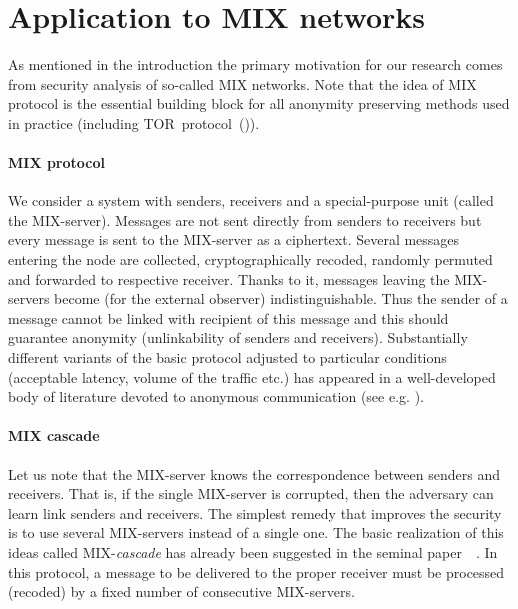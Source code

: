 \documentclass[submission]{dmtcs}
\begin{document}
\section{Application to MIX networks}
\label{MIX}

As mentioned in the introduction the primary motivation for our research comes from  security analysis of so-called MIX networks. 
Note that the idea of MIX protocol is the essential building block for all anonymity preserving methods used in practice (including TOR~protocol~(\cite{TOR04})). 


\paragraph{MIX protocol} We consider a system with senders, receivers and a special-purpose unit (called the MIX-server). Messages are not sent directly from senders to receivers but every message is sent to the MIX-server as a ciphertext. Several messages entering the node are collected,  cryptographically recoded, randomly permuted and forwarded to respective receiver. Thanks to it, messages leaving the MIX-servers become (for the external observer) indistinguishable. Thus the  sender of a message cannot be linked with recipient of this  message and this should guarantee anonymity (unlinkability of senders and receivers).  
Substantially different variants of the basic protocol adjusted to particular conditions (acceptable latency, volume of the traffic etc.)    has appeared in a well-developed body of literature devoted to anonymous communication (see e.g.  \cite{SUR}). 


\paragraph{MIX cascade}  Let us note that the  MIX-server knows  the correspondence between senders and receivers. That is, if the single 
MIX-server is corrupted, then the adversary can learn link senders and receivers. The simplest remedy that improves the security is to use several MIX-servers instead of a single one. The basic realization of this ideas called MIX-\textit{cascade} has already been suggested in the seminal paper~\cite{MIX}~. 
In this protocol, a message to be delivered to the proper receiver must be processed  (recoded) by a fixed number of consecutive MIX-servers. 
\end{document}
